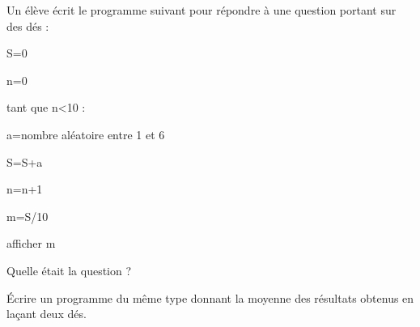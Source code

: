 
\begin{exercice}\label{exosmath-0554}

    Un élève écrit le programme suivant pour répondre à une question portant sur des dés :
\begin{fmpage}{0.9\linewidth}

    S=0

    n=0

    tant que n<10 :

    \hspace{1cm} a=nombre aléatoire entre 1 et 6

    \hspace{1cm} S=S+a

    \hspace{1cm} n=n+1

    m=S/10

    afficher m

\end{fmpage}

Quelle était la question ?

Écrire un programme du même type donnant la moyenne des résultats obtenus en laçant deux dés.

\end{exercice}
